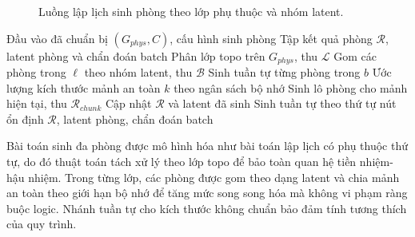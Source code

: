 \documentclass[oneside,a4paper,12pt]{extreport}
\begin{document}
\begin{figure}[H]
\centering
{}
\caption{Luồng lập lịch sinh phòng theo lớp phụ thuộc và nhóm latent.}
\label{fig:layer_bucket_scheduler}
\end{figure}

\begin{algorithm}[H]
\caption{Lập lịch sinh phòng theo lớp phụ thuộc}
\label{alg:layer_bucket_scheduler}
\begin{algorithmic}[1]
\Require Đầu vào đã chuẩn bị $(G_{phys}, C)$, cấu hình sinh phòng
\Ensure Tập kết quả phòng $\mathcal{R}$, latent phòng và chẩn đoán batch
  \State Phân lớp topo trên $G_{phys}$, thu $\mathcal{L}$
    \State Gom các phòng trong $\ell$ theo nhóm latent, thu $\mathcal{B}$
        \State Sinh tuần tự từng phòng trong $b$
      \Else
        \State Ước lượng kích thước mảnh an toàn $k$ theo ngân sách bộ nhớ
          \State Sinh lô phòng cho mảnh hiện tại, thu $\mathcal{R}_{chunk}$
          \State Cập nhật $\mathcal{R}$ và latent đã sinh
        \EndFor
      \EndIf
    \EndFor
  \EndFor
\Else
  \State Sinh tuần tự theo thứ tự nút ổn định
\EndIf
\State \Return $\mathcal{R}$, latent phòng, chẩn đoán batch
\end{algorithmic}
\end{algorithm}

Bài toán sinh đa phòng được mô hình hóa như bài toán lập lịch có phụ thuộc thứ tự, do đó thuật toán tách xử lý theo lớp topo để bảo toàn quan hệ tiền nhiệm-hậu nhiệm. Trong từng lớp, các phòng được gom theo dạng latent và chia mảnh an toàn theo giới hạn bộ nhớ để tăng mức song song hóa mà không vi phạm ràng buộc logic. Nhánh tuần tự cho kích thước không chuẩn bảo đảm tính tương thích của quy trình.
\end{document}
